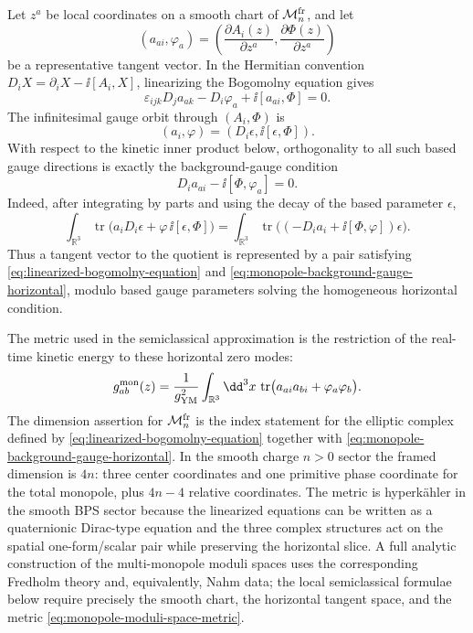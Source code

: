 Let \(z^a\) be local coordinates on a smooth chart of
\(\mathcal M_n^{\rm fr}\), and let
\[
  (a_{a i},\varphi_a)
  =
  \left(
    \frac{\partial A_i(z)}{\partial z^a},
    \frac{\partial\Phi(z)}{\partial z^a}
  \right)
\]
be a representative tangent vector.  In the Hermitian convention
\(D_iX=\partial_iX-\ii[A_i,X]\), linearizing the Bogomolny equation gives
\begin{equation}
  \varepsilon_{ijk}D_j a_{a k}
  -D_i\varphi_a
  +\ii[a_{a i},\Phi]
  =
  0.
  \label{eq:linearized-bogomolny-equation}
\end{equation}
The infinitesimal gauge orbit through \((A_i,\Phi)\) is
\[
  (a_i,\varphi)=(D_i\epsilon,\ii[\epsilon,\Phi]).
\]
With respect to the kinetic inner product below, orthogonality to all such
based gauge directions is exactly the background-gauge condition
\begin{equation}
  D_i a_{a i}-\ii[\Phi,\varphi_a]=0 .
  \label{eq:monopole-background-gauge-horizontal}
\end{equation}
Indeed, after integrating by parts and using the decay of the based
parameter \(\epsilon\),
\[
  \int_{\mathbb R^3}\operatorname{tr}
  \bigl(a_iD_i\epsilon+\varphi\,\ii[\epsilon,\Phi]\bigr)
  =
  \int_{\mathbb R^3}\operatorname{tr}
  \bigl((-D_i a_i+\ii[\Phi,\varphi])\epsilon\bigr).
\]
Thus a tangent vector to the quotient is represented by a pair satisfying
\eqref{eq:linearized-bogomolny-equation} and
\eqref{eq:monopole-background-gauge-horizontal}, modulo based gauge
parameters solving the homogeneous horizontal condition.

The metric used in the semiclassical approximation is the restriction of the
real-time kinetic energy to these horizontal zero modes:
\begin{equation}
  g_{ab}^{\rm mon}(z)
  =
  \frac1{g_{\mathrm{YM}}^2}
  \int_{\mathbb R^3}\dd^3x\,
  \operatorname{tr}
  \bigl(a_{a i}a_{b i}+\varphi_a\varphi_b\bigr).
  \label{eq:monopole-moduli-space-metric}
\end{equation}
The dimension assertion for \(\mathcal M_n^{\rm fr}\) is the index statement
for the elliptic complex defined by
\eqref{eq:linearized-bogomolny-equation} together with
\eqref{eq:monopole-background-gauge-horizontal}.  In the smooth charge
\(n>0\) sector the framed dimension is \(4n\): three center coordinates and
one primitive phase coordinate for the total monopole, plus
\(4n-4\) relative coordinates.  The metric is hyperk\"ahler in the smooth BPS
sector because the linearized equations can be written as a quaternionic
Dirac-type equation and the three complex structures act on the spatial
one-form/scalar pair while preserving the horizontal slice.  A full analytic
construction of the multi-monopole moduli spaces uses the corresponding
Fredholm theory and, equivalently, Nahm data; the local semiclassical
formulae below require precisely the smooth chart, the horizontal tangent
space, and the metric \eqref{eq:monopole-moduli-space-metric}.


